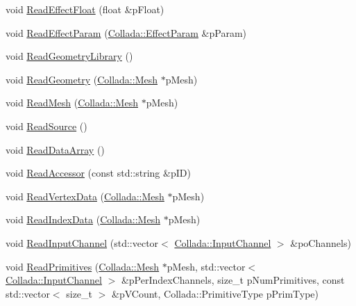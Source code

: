 \begin{DoxyCompactItemize}
\item 
void \hyperlink{class_assimp_1_1_collada_parser_a71b686fcd1efb902835bedde0a050bde}{Read\+Effect\+Float} (float \&p\+Float)
\item 
void \hyperlink{class_assimp_1_1_collada_parser_a99f6e4c2dc92d835e16a2db863337c0b}{Read\+Effect\+Param} (\hyperlink{struct_assimp_1_1_collada_1_1_effect_param}{Collada\+::\+Effect\+Param} \&p\+Param)
\item 
void \hyperlink{class_assimp_1_1_collada_parser_aeab10c144dadce3626ab2d8432def349}{Read\+Geometry\+Library} ()
\item 
void \hyperlink{class_assimp_1_1_collada_parser_a516dbc59dcabe1474e3b802d13eac8e1}{Read\+Geometry} (\hyperlink{struct_assimp_1_1_collada_1_1_mesh}{Collada\+::\+Mesh} $\ast$p\+Mesh)
\item 
void \hyperlink{class_assimp_1_1_collada_parser_acc839aeae53ac30f89bf23d8640e1d7c}{Read\+Mesh} (\hyperlink{struct_assimp_1_1_collada_1_1_mesh}{Collada\+::\+Mesh} $\ast$p\+Mesh)
\item 
void \hyperlink{class_assimp_1_1_collada_parser_ae0fa33fc8ea21a024f47c3712ee51739}{Read\+Source} ()
\item 
void \hyperlink{class_assimp_1_1_collada_parser_a33ce4f10dac72f4803668d921b7171b3}{Read\+Data\+Array} ()
\item 
void \hyperlink{class_assimp_1_1_collada_parser_a64ca79301f9a34d8ea3fbb6f0c52ff7c}{Read\+Accessor} (const std\+::string \&p\+I\+D)
\item 
void \hyperlink{class_assimp_1_1_collada_parser_a2035fdc6f9e56163b0f8a461e80dd5d8}{Read\+Vertex\+Data} (\hyperlink{struct_assimp_1_1_collada_1_1_mesh}{Collada\+::\+Mesh} $\ast$p\+Mesh)
\item 
void \hyperlink{class_assimp_1_1_collada_parser_a61108ba6075e2b2d90eea18eb7fbdb7f}{Read\+Index\+Data} (\hyperlink{struct_assimp_1_1_collada_1_1_mesh}{Collada\+::\+Mesh} $\ast$p\+Mesh)
\item 
void \hyperlink{class_assimp_1_1_collada_parser_affc8d77d8f7f71cb5bc86cb1306f5614}{Read\+Input\+Channel} (std\+::vector$<$ \hyperlink{struct_assimp_1_1_collada_1_1_input_channel}{Collada\+::\+Input\+Channel} $>$ \&po\+Channels)
\item 
void \hyperlink{class_assimp_1_1_collada_parser_aa6aaeaa74ed0e5fcc5ad1e596ce32444}{Read\+Primitives} (\hyperlink{struct_assimp_1_1_collada_1_1_mesh}{Collada\+::\+Mesh} $\ast$p\+Mesh, std\+::vector$<$ \hyperlink{struct_assimp_1_1_collada_1_1_input_channel}{Collada\+::\+Input\+Channel} $>$ \&p\+Per\+Index\+Channels, size\+\_\+t p\+Num\+Primitives, const std\+::vector$<$ size\+\_\+t $>$ \&p\+V\+Count, Collada\+::\+Primitive\+Type p\+Prim\+Type)

\end{DoxyCompactItemize}
